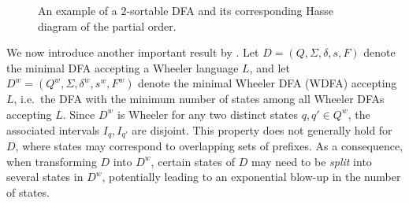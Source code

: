 \begin{example}
\begin{figure}[H]
\begin{subfigure}[b]{0.35\textwidth}
            \caption{}
            \label{fig:non_wheeler_graph_poset}
        \end{subfigure}
        \caption{An example of a $2$-sortable DFA and its corresponding Hasse diagram of the partial order.}
        \label{fig:non_wheeler_example}
    \end{figure}
\end{example}

We now introduce another important result by \cite{manziniRationalConstructionWheeler2024}. Let $D = (Q, \Sigma, \delta, s, F)$ denote the minimal DFA accepting a Wheeler language $L$, and let $D^w = (Q^w, \Sigma, \delta^w, s^w, F^w)$ denote the minimal Wheeler DFA (WDFA) accepting $L$, i.e.\ the DFA with the minimum number of states among all Wheeler DFAs accepting $L$. Since $D^w$ is Wheeler for any two distinct states $q, q' \in Q^w$, the associated intervals $I_q, I_{q'}$ are disjoint. This property does not generally hold for $D$, where states may correspond to overlapping sets of prefixes. As a consequence, when transforming $D$ into $D^w$, certain states of $D$ may need to be \emph{split} into several states in $D^w$, potentially leading to an exponential blow-up in the number of states.

